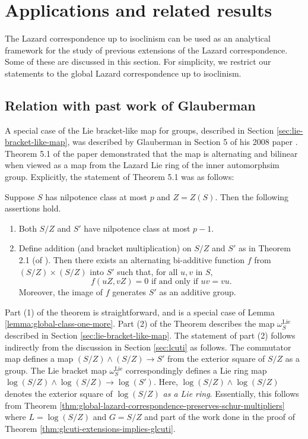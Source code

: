 \section{Applications and related results}\label{sec:applications}

The Lazard correspondence up to isoclinism can be used as an
analytical framework for the study of previous extensions of the
Lazard correspondence. Some of these are discussed in this
section. For simplicity, we restrict our statements to the global
Lazard correspondence up to isoclinism.

\subsection{Relation with past work of Glauberman}\label{sec:rel-gg08}

A special case of the Lie bracket-like map for groups, described in
Section \ref{sec:lie-bracket-like-map}, was described by Glauberman in
Section 5 of his 2008 paper \cite{GG08}. Theorem 5.1 of the paper
demonstrated that the map is alternating and bilinear when viewed as a
map from the Lazard Lie ring of the inner automorphsim
group. Explicitly, the statement of Theorem 5.1 was as follows:

\begin{theorem}
  Suppose $S$ has nilpotence class at most $p$ and $Z=Z(S)$. Then the following assertions hold.
  \begin{enumerate}
    \item Both $S/Z$ and $S'$ have nilpotence class at most $p-1$.
    \item Define addition (and bracket multiplication) on $S/Z$ and
      $S'$ as in Theorem 2.1 (of \cite{GG08}). Then there exists an
      alternating bi-additive function $f$ from $(S/Z)\times(S/Z)$
      into $S'$ such that, for all $u, v$ in $S$,
      $$f(uZ,vZ)=0\text{ if and only if }uv=vu.$$
      Moreover, the image of $f$ generates $S'$ as an additive group.
  \end{enumerate}
\end{theorem}

Part (1) of the theorem is straightforward, and is a special case of
Lemma \ref{lemma:global-class-one-more}. Part (2) of the Theorem
describes the map $\omega_S^{\text{Lie}}$ described in Section
\ref{sec:lie-bracket-like-map}. The statement of part (2) follows
indirectly from the discussion in Section \ref{sec:lcuti} as
follows. The commutator map defines a map $(S/Z) \wedge (S/Z) \to S'$
from the exterior square of $S/Z$ as a group. The Lie bracket map
$\omega_S^{\text{Lie}}$ correspondingly defines a Lie ring map
$\log(S/Z) \wedge \log (S/Z) \to \log(S')$. Here, $\log(S/Z) \wedge
\log(S/Z)$ denotes the exterior square of $\log(S/Z)$ {\em as a Lie
  ring}. Essentially, this follows from Theorem
\ref{thm:global-lazard-correspondence-preserves-schur-multipliers}
where $L = \log(S/Z)$ and $G = S/Z$ and part of the work done in the
proof of Theorem \ref{thm:glcuti-extensions-implies-glcuti}.


